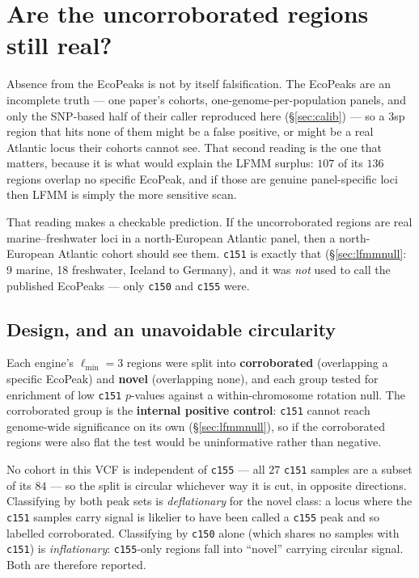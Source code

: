 \documentclass[11pt,a4paper]{article}
\begin{document}
\section{Are the uncorroborated regions still real?}\label{sec:novel}

Absence from the EcoPeaks is not by itself falsification. The EcoPeaks are an incomplete
truth --- one paper's cohorts, one-genome-per-population panels, and only the SNP-based
half of their caller reproduced here (\S\ref{sec:calib}) --- so a 3sp region that hits none
of them might be a false positive, or might be a real Atlantic locus their cohorts cannot
see. That second reading is the one that matters, because it is what would explain the LFMM
surplus: $107$ of its $136$ regions overlap no specific EcoPeak, and if those are genuine
panel-specific loci then LFMM is simply the more sensitive scan.

That reading makes a checkable prediction. If the uncorroborated regions are real
marine--freshwater loci in a north-European Atlantic panel, then a north-European Atlantic
cohort should see them. \texttt{c151} is exactly that (\S\ref{sec:lfmmnull}: 9 marine, 18
freshwater, Iceland to Germany), and it was \emph{not} used to call the published
EcoPeaks --- only \texttt{c150} and \texttt{c155} were.

\subsection{Design, and an unavoidable circularity}

Each engine's $\ell_{\min} = 3$ regions were split into \textbf{corroborated} (overlapping a
specific EcoPeak) and \textbf{novel} (overlapping none), and each group tested for
enrichment of low \texttt{c151} $p$-values against a within-chromosome rotation null. The
corroborated group is the \textbf{internal positive control}: \texttt{c151} cannot reach
genome-wide significance on its own (\S\ref{sec:lfmmnull}), so if the corroborated regions
were also flat the test would be uninformative rather than negative.

No cohort in this VCF is independent of \texttt{c155} --- all $27$ \texttt{c151} samples are
a subset of its $84$ --- so the split is circular whichever way it is cut, in opposite
directions. Classifying by both peak sets is \emph{deflationary} for the novel class: a
locus where the \texttt{c151} samples carry signal is likelier to have been called a
\texttt{c155} peak and so labelled corroborated. Classifying by \texttt{c150} alone (which
shares no samples with \texttt{c151}) is \emph{inflationary}: \texttt{c155}-only regions
fall into ``novel'' carrying circular signal. Both are therefore reported.
\end{document}
